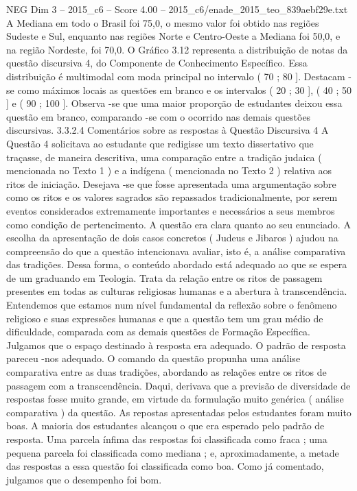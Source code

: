 \begin{textsample}{NEG Dim 3 – 2015\_c6 – Score 4.00 – 2015\_c6/enade\_2015\_teo\_839aebf29e.txt}
A Mediana em todo o Brasil foi 75,0, o mesmo valor foi obtido nas regiões Sudeste e Sul, enquanto nas regiões Norte e Centro-Oeste a Mediana foi 50,0, e na região Nordeste, foi 70,0.
O Gráfico 3.12 representa a distribuição de notas da questão discursiva 4, do Componente de Conhecimento Específico.
Essa distribuição é multimodal com moda principal no intervalo ( 70 ; 80 ].
Destacam -se como máximos locais as questões em branco e os intervalos ( 20 ; 30 ], ( 40 ; 50 ] e ( 90 ; 100 ].
Observa -se que uma maior proporção de estudantes deixou essa questão em branco, comparando -se com o ocorrido nas demais questões discursivas. 3.3.2.4 Comentários sobre as respostas à Questão Discursiva 4 A Questão 4 solicitava ao estudante que redigisse um texto dissertativo que traçasse, de maneira descritiva, uma comparação entre a tradição judaica ( mencionada no Texto 1 ) e a indígena ( mencionada no Texto 2 ) relativa aos ritos de iniciação.
Desejava -se que fosse apresentada uma argumentação sobre como os ritos e os valores sagrados são repassados tradicionalmente, por serem eventos considerados extremamente importantes e necessários a seus membros como condição de pertencimento.
A questão era clara quanto ao seu enunciado.
A escolha da apresentação de dois casos concretos ( Judeus e Jibaros ) ajudou na compreensão do que a questão intencionava avaliar, isto é, a análise comparativa das tradições.
Dessa forma, o conteúdo abordado está adequado ao que se espera de um graduando em Teologia.
Trata da relação entre os ritos de passagem presentes em todas as culturas religiosas humanas e a abertura à transcendência.
Entendemos que estamos num nível fundamental da reflexão sobre o fenômeno religioso e suas expressões humanas e que a questão tem um grau médio de dificuldade, comparada com as demais questões de Formação Específica.
Julgamos que o espaço destinado à resposta era adequado.
O padrão de resposta pareceu -nos adequado.
O comando da questão propunha uma análise comparativa entre as duas tradições, abordando as relações entre os ritos de passagem com a transcendência.
Daqui, derivava que a previsão de diversidade de respostas fosse muito grande, em virtude da formulação muito genérica ( análise comparativa ) da questão.
As repostas apresentadas pelos estudantes foram muito boas.
A maioria dos estudantes alcançou o que era esperado pelo padrão de resposta.
Uma parcela ínfima das respostas foi classificada como fraca ; uma pequena parcela foi classificada como mediana ; e, aproximadamente, a metade das respostas a essa questão foi classificada como boa.
Como já comentado, julgamos que o desempenho foi bom.

\end{textsample}
